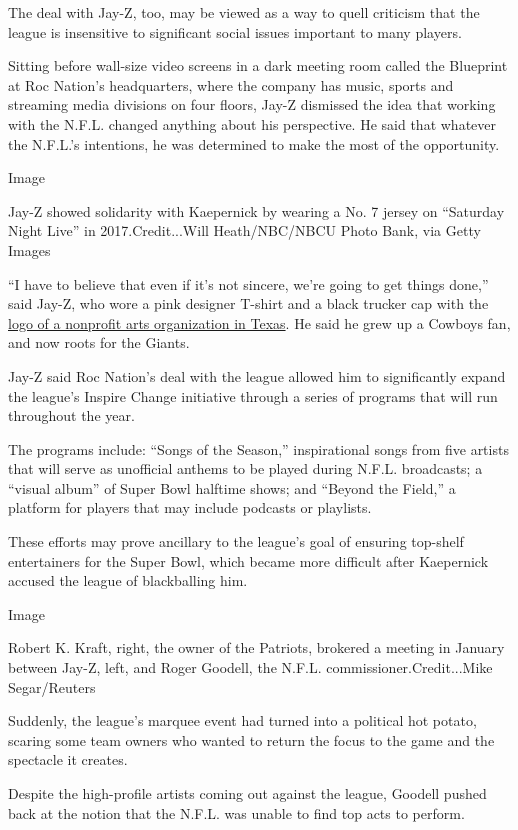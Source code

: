 The deal with Jay-Z, too, may be viewed as a way to quell criticism that
the league is insensitive to significant social issues important to many
players.

Sitting before wall-size video screens in a dark meeting room called the
Blueprint at Roc Nation's headquarters, where the company has music,
sports and streaming media divisions on four floors, Jay-Z dismissed the
idea that working with the N.F.L. changed anything about his
perspective. He said that whatever the N.F.L.'s intentions, he was
determined to make the most of the opportunity.

Image

Jay-Z showed solidarity with Kaepernick by wearing a No. 7 jersey on
``Saturday Night Live'' in 2017.Credit...Will Heath/NBC/NBCU Photo Bank,
via Getty Images

``I have to believe that even if it's not sincere, we're going to get
things done,'' said Jay-Z, who wore a pink designer T-shirt and a black
trucker cap with the
\href{https://www.highsnobiety.com/p/jay-z-ballroom-marfa/}{logo of a
nonprofit arts organization in Texas}. He said he grew up a Cowboys fan,
and now roots for the Giants.

Jay-Z said Roc Nation's deal with the league allowed him to
significantly expand the league's Inspire Change initiative through a
series of programs that will run throughout the year.

The programs include: ``Songs of the Season,'' inspirational songs from
five artists that will serve as unofficial anthems to be played during
N.F.L. broadcasts; a ``visual album'' of Super Bowl halftime shows; and
``Beyond the Field,'' a platform for players that may include podcasts
or playlists.

These efforts may prove ancillary to the league's goal of ensuring
top-shelf entertainers for the Super Bowl, which became more difficult
after Kaepernick accused the league of blackballing him.

Image

Robert K. Kraft, right, the owner of the Patriots, brokered a meeting in
January between Jay-Z, left, and Roger Goodell, the N.F.L.
commissioner.Credit...Mike Segar/Reuters

Suddenly, the league's marquee event had turned into a political hot
potato, scaring some team owners who wanted to return the focus to the
game and the spectacle it creates.

Despite the high-profile artists coming out against the league, Goodell
pushed back at the notion that the N.F.L. was unable to find top acts to
perform.

